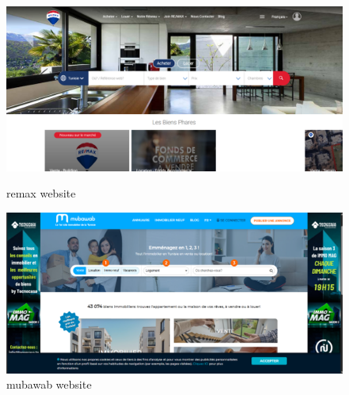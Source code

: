 \begin{figure}[htbp]
    \vspace{0.75cm}
    
    \begin{minipage}{0.47\textwidth}
        \centering
        \includegraphics[width=\linewidth]{images/remax.png}
        \caption{remax website}
        \label{fig:remax-website}
    \end{minipage}
    \hfill
    \begin{minipage}{0.47\textwidth}
        \centering
        \includegraphics[width=\linewidth]{images/mub.png}
        \caption{mubawab website}
        \label{fig:mubawab-website}
    \end{minipage}
\end{figure}



